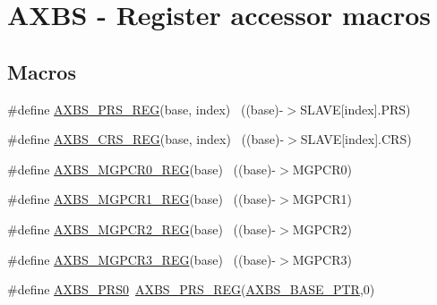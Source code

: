 \hypertarget{group___a_x_b_s___register___accessor___macros}{}\section{A\+X\+BS -\/ Register accessor macros}
\label{group___a_x_b_s___register___accessor___macros}
\subsection*{Macros}
\begin{DoxyCompactItemize}
\item 
\#define \hyperlink{group___a_x_b_s___register___accessor___macros_gadfe35678a94e899b6b19386de08d3472}{A\+X\+B\+S\+\_\+\+P\+R\+S\+\_\+\+R\+EG}(base,  index)                              ~((base)-\/$>$S\+L\+A\+VE\mbox{[}index\mbox{]}.P\+RS)
\item 
\#define \hyperlink{group___a_x_b_s___register___accessor___macros_ga77c6588049d7ae23bbfd8c643a5adbed}{A\+X\+B\+S\+\_\+\+C\+R\+S\+\_\+\+R\+EG}(base,  index)                              ~((base)-\/$>$S\+L\+A\+VE\mbox{[}index\mbox{]}.C\+RS)
\item 
\#define \hyperlink{group___a_x_b_s___register___accessor___macros_ga73d5437b701295ca86a3c050a866cf37}{A\+X\+B\+S\+\_\+\+M\+G\+P\+C\+R0\+\_\+\+R\+EG}(base)                                    ~((base)-\/$>$M\+G\+P\+C\+R0)
\item 
\#define \hyperlink{group___a_x_b_s___register___accessor___macros_gacbc3fc10e92190984302e2c4426afdd9}{A\+X\+B\+S\+\_\+\+M\+G\+P\+C\+R1\+\_\+\+R\+EG}(base)                                    ~((base)-\/$>$M\+G\+P\+C\+R1)
\item 
\#define \hyperlink{group___a_x_b_s___register___accessor___macros_gab08d4773427a7ffad127e4fc1c6cc024}{A\+X\+B\+S\+\_\+\+M\+G\+P\+C\+R2\+\_\+\+R\+EG}(base)                                    ~((base)-\/$>$M\+G\+P\+C\+R2)
\item 
\#define \hyperlink{group___a_x_b_s___register___accessor___macros_gad34f5ebc24175e258b13abd4caa86ee4}{A\+X\+B\+S\+\_\+\+M\+G\+P\+C\+R3\+\_\+\+R\+EG}(base)                                    ~((base)-\/$>$M\+G\+P\+C\+R3)
\item 
\#define \hyperlink{group___a_x_b_s___register___accessor___macros_ga51c41c430b9e769dba2e453a898544ec}{A\+X\+B\+S\+\_\+\+P\+R\+S0}~\hyperlink{group___a_x_b_s___register___accessor___macros_gadfe35678a94e899b6b19386de08d3472}{A\+X\+B\+S\+\_\+\+P\+R\+S\+\_\+\+R\+EG}(\hyperlink{group___a_x_b_s___peripheral_gacbbf56489b86d1ddb3e0ac291922a56d}{A\+X\+B\+S\+\_\+\+B\+A\+S\+E\+\_\+\+P\+TR},0)

\end{DoxyCompactItemize}
